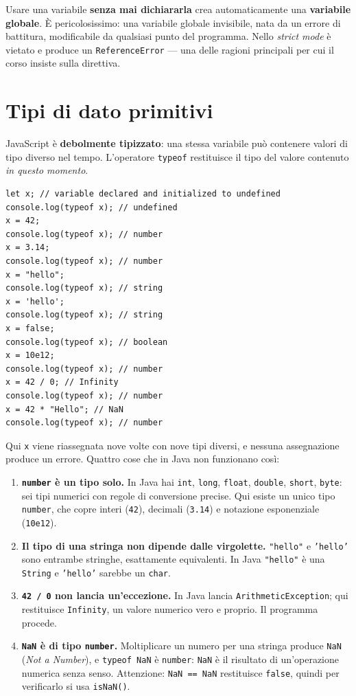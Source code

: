 \documentclass[10pt,a4paper]{article}
\begin{document}
Usare una variabile \textbf{senza mai dichiararla} crea automaticamente una \textbf{variabile globale}. È pericolosissimo: una variabile globale invisibile, nata da un errore di battitura, modificabile da qualsiasi punto del programma. Nello \emph{strict mode} è vietato e produce un \texttt{ReferenceError} --- una delle ragioni principali per cui il corso insiste sulla direttiva.

\section{Tipi di dato primitivi}

JavaScript è \textbf{debolmente tipizzato}: una stessa variabile può contenere valori di tipo diverso nel tempo. L'operatore \texttt{typeof} restituisce il tipo del valore contenuto \emph{in questo momento}.

\begin{lstlisting}[style=js]
let x; // variable declared and initialized to undefined
console.log(typeof x); // undefined
x = 42;
console.log(typeof x); // number
x = 3.14;
console.log(typeof x); // number
x = "hello";
console.log(typeof x); // string
x = 'hello';
console.log(typeof x); // string
x = false;
console.log(typeof x); // boolean
x = 10e12;
console.log(typeof x); // number
x = 42 / 0; // Infinity
console.log(typeof x); // number
x = 42 * "Hello"; // NaN
console.log(typeof x); // number
\end{lstlisting}

Qui \texttt{x} viene riassegnata nove volte con nove tipi diversi, e nessuna assegnazione produce un errore. Quattro cose che in Java non funzionano così:

\begin{enumerate}
  \item \textbf{\texttt{number} è un tipo solo.} In Java hai \texttt{int}, \texttt{long}, \texttt{float}, \texttt{double}, \texttt{short}, \texttt{byte}: sei tipi numerici con regole di conversione precise. Qui esiste un unico tipo \texttt{number}, che copre interi (\texttt{42}), decimali (\texttt{3.14}) e notazione esponenziale (\texttt{10e12}).
  \item \textbf{Il tipo di una stringa non dipende dalle virgolette.} \texttt{"hello"} e \texttt{'hello'} sono entrambe stringhe, esattamente equivalenti. In Java \texttt{"hello"} è una \texttt{String} e \texttt{'hello'} sarebbe un \texttt{char}.
  \item \textbf{\texttt{42 / 0} non lancia un'eccezione.} In Java lancia \texttt{ArithmeticException}; qui restituisce \texttt{Infinity}, un valore numerico vero e proprio. Il programma procede.
  \item \textbf{\texttt{NaN} è di tipo \texttt{number}.} Moltiplicare un numero per una stringa produce \texttt{NaN} (\emph{Not a Number}), e \texttt{typeof NaN} è \texttt{number}: \texttt{NaN} è il risultato di un'operazione numerica senza senso. Attenzione: \texttt{NaN == NaN} restituisce \texttt{false}, quindi per verificarlo si usa \texttt{isNaN()}.
\end{enumerate}
\end{document}
